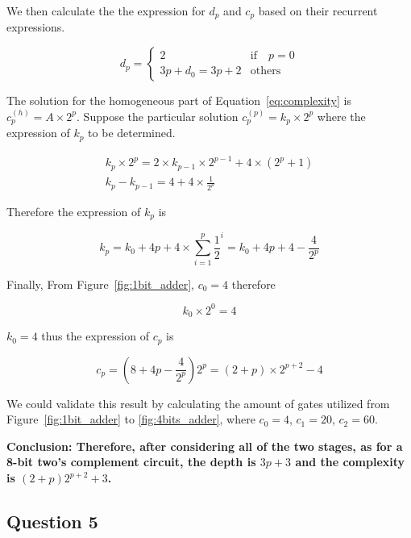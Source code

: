 \documentclass[conference]{IEEEtran}
\begin{document}
We then calculate the the expression for $d_p$ and $c_p$ based on their recurrent expressions.

\begin{equation}
    d_p = \begin{cases}
        2 \quad &\text{if} \quad p = 0 \\
        3p + d_0 = 3p + 2 &\text{others}
    \end{cases}
\end{equation}

The solution for the homogeneous part of Equation~\ref{eq:complexity} is $c_p^{(h)} = A \times 2^p$. Suppose the particular solution $c_p^{(p)} = k_p\times 2^p$ where the expression of $k_p$ to be determined.

\begin{gather*}
    k_p \times 2^p = 2 \times k_{p-1} \times 2^{p-1} + 4 \times (2^p+1) \\
    k_p - k_{p-1} =4 + 4 \times \frac{1}{2^p}
\end{gather*}

Therefore the expression of $k_p$ is 

\begin{equation}
    k_p = k_0 +  4p + 4 \times \sum_{i=1}^{p} \frac{1}{2}^{i} = k_0 + 4p+4- \frac{4}{2^p}
\end{equation}

Finally, From Figure~\ref{fig:1bit_adder}, $c_0 = 4$ therefore

\begin{equation}
    k_0 \times 2^0 = 4
\end{equation}

$k_0 = 4$ thus the expression of $c_p$ is 

\begin{equation}
    c_p = (8 + 4p - \frac{4}{2^p}) 2^p = (2+ p) \times 2^{p+2} - 4
\end{equation}

We could validate this result by calculating the amount of gates utilized from Figure~\ref{fig:1bit_adder} to \ref{fig:4bits_adder}, where $c_0 = 4$, $c_1=20$, $c_2=60$.


\textbf{Conclusion: Therefore, after considering all of the two stages, as for a 8-bit two's complement circuit, the depth is $3p+3$ and the complexity is $(2+p)2^{p+2} + 3$.}

\subsection{Question 5}
\end{document}
